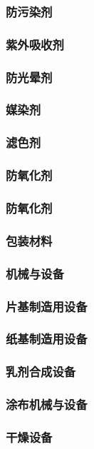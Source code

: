 \documentclass[UTF8]{../../ApplicationUniverse}
\begin{document}
        \subsubsection{防污染剂}
        \subsubsection{紫外吸收剂}
            \subsubsection{防光晕剂}
            \subsubsection{媒染剂}
            \subsubsection{滤色剂}
            \subsubsection{防氧化剂}
            \subsubsection{防氧化剂}
    \subsubsection{包装材料}
\subsubsection{机械与设备}
    \subsubsection{片基制造用设备}
        \subsubsection{纸基制造用设备}
    \subsubsection{乳剂合成设备}
    \subsubsection{涂布机械与设备}
    \subsubsection{干燥设备}
\end{document}
